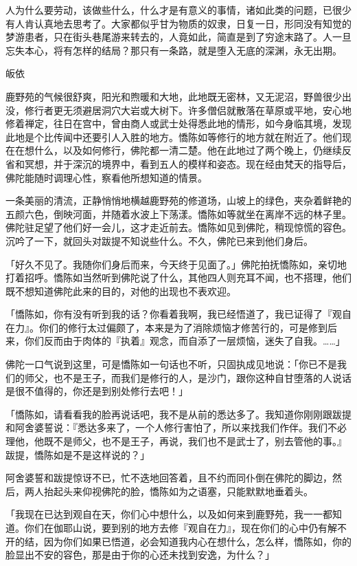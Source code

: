 \documentclass[12pt,twoside,openany]{book}
\begin{document}
人为什么要劳动，该做些什么，什么才是有意义的事情，诸如此类的问题，已很少有人肯认真地去思考了。大家都似乎甘为物质的奴隶，日复一日，形同没有知觉的梦游患者，只在街头巷尾游来转去的，人竟如此，简直是到了穷途末路了。人一旦忘失本心，将有怎样的结局？那只有一条路，就是堕入无底的深渊，永无出期。

皈依

鹿野苑的气候很舒爽，阳光和煦暖和大地，此地既无密林，又无泥沼，野兽很少出没，修行者更无须避居洞穴大岩或大树下。许多僧侣就散落在草原或平地，安心地修着禅定，往日在宫中，曾由商人或武士处得悉此地的情形，如今身临其境，发现此地是个比传闻中还要引人入胜的地方。憍陈如等修行的地方就在附近了。他们现在在想什么，以及如何修行，佛陀都一清二楚。他在此地过了两个晚上，仍继续反省和冥想，并于深沉的境界中，看到五人的模样和姿态。现在经由梵天的指导后，佛陀能随时调理心性，察看他所想知道的情景。

一条美丽的清流，正静悄悄地横越鹿野苑的修道场，山坡上的绿色，夹杂着鲜艳的五颜六色，倒映河面，并随着水波上下荡漾。憍陈如等就坐在离岸不远的林子里。佛陀驻足望了他们好一会儿，这才走近前去。憍陈如见到佛陀，稍现惊慌的容色。沉吟了一下，就回头对跋提不知说些什么。不久，佛陀已来到他们身后。

「好久不见了。我随你们身后而来，今天终于见面了。」佛陀拍抚憍陈如，亲切地打着招呼。憍陈如当然听到佛陀说了什么，其他四人则充耳不闻，也不搭理，他们既不想知道佛陀此来的目的，对他的出现也不表欢迎。

「憍陈如，你有没有听到我的话？你看着我啊，我已经悟道了，我已证得了『观自在力』。你们的修行太过偏颇了，本来是为了消除烦恼才修苦行的，可是修到后来，你们反而由于肉体的『执着』观念，而自添了一层烦恼，迷失了自我。……」

佛陀一口气说到这里，可是憍陈如一句话也不听，只固执成见地说：「你已不是我们的师父，也不是王子，而我们是修行的人，是沙门，跟你这种自甘堕落的人说话是很不值得的，你还是到别处修行去吧！」

「憍陈如，请看看我的脸再说话吧，我不是从前的悉达多了。我知道你刚刚跟跋提和阿舍婆誓说：『悉达多来了，一个人修行害怕了，所以来找我们作伴。我们不必理他，他既不是师父，也不是王子，再说，我们也不是武士了，别去管他的事。』跋提，憍陈如是不是这样说的？」

阿舍婆誓和跋提惊讶不已，忙不迭地回答着，且不约而同仆倒在佛陀的脚边，然后，两人抬起头来仰视佛陀的脸，憍陈如为之语塞，只能默默地垂着头。

「我现在已达到观自在天，你们心中想什么，以及如何来到鹿野苑，我一一都知道。你们在伽耶山说，要到别的地方去修『观自在力』，现在你们的心中仍有解不开的结，因为你们如果已悟道，必会知道我内心在想什么，怎么样，憍陈如，你的脸显出不安的容色，那是由于你的心还未找到安逸，为什么？」
\end{document}
